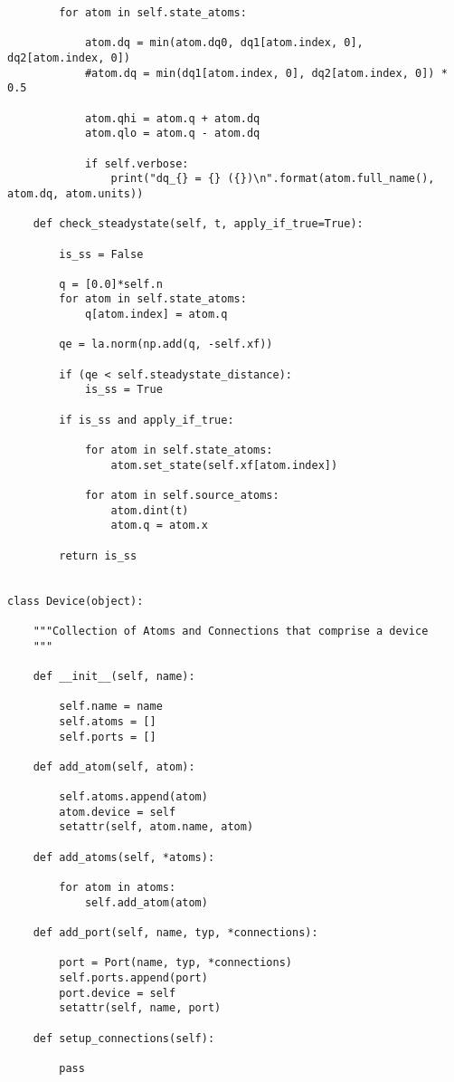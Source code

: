 \begin{lstlisting}
        for atom in self.state_atoms:

            atom.dq = min(atom.dq0, dq1[atom.index, 0], dq2[atom.index, 0])
            #atom.dq = min(dq1[atom.index, 0], dq2[atom.index, 0]) * 0.5

            atom.qhi = atom.q + atom.dq
            atom.qlo = atom.q - atom.dq

            if self.verbose:
                print("dq_{} = {} ({})\n".format(atom.full_name(), atom.dq, atom.units))

    def check_steadystate(self, t, apply_if_true=True):

        is_ss = False

        q = [0.0]*self.n
        for atom in self.state_atoms:
            q[atom.index] = atom.q

        qe = la.norm(np.add(q, -self.xf))

        if (qe < self.steadystate_distance):
            is_ss = True

        if is_ss and apply_if_true:

            for atom in self.state_atoms:
                atom.set_state(self.xf[atom.index])

            for atom in self.source_atoms:
                atom.dint(t)
                atom.q = atom.x

        return is_ss


class Device(object):

    """Collection of Atoms and Connections that comprise a device
    """

    def __init__(self, name):

        self.name = name
        self.atoms = []
        self.ports = []

    def add_atom(self, atom):

        self.atoms.append(atom)
        atom.device = self
        setattr(self, atom.name, atom)

    def add_atoms(self, *atoms):

        for atom in atoms:
            self.add_atom(atom)

    def add_port(self, name, typ, *connections):

        port = Port(name, typ, *connections)
        self.ports.append(port)
        port.device = self
        setattr(self, name, port)

    def setup_connections(self):

        pass


\end{lstlisting}
